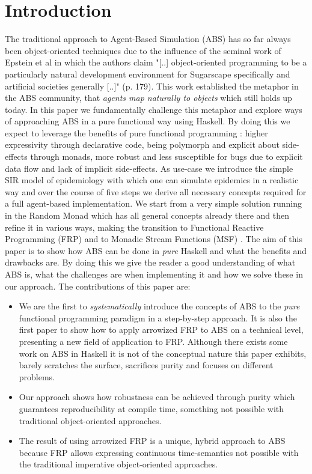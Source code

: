 \section{Introduction}
The traditional approach to Agent-Based Simulation (ABS) has so far always been object-oriented techniques due to the influence of the seminal work of Epstein et al \cite{epstein_growing_1996} in which the authors claim "[..] object-oriented programming to be a particularly natural development environment for Sugarscape specifically and artificial societies generally [..]" (p. 179). This work established the metaphor in the ABS community, that \textit{agents map naturally to objects} \cite{north_managing_2007} which still holds up today.
In this paper we fundamentally challenge this metaphor and explore ways of approaching ABS in a pure functional way using Haskell. By doing this we expect to leverage the benefits of pure functional programming \cite{hudak_history_2007}: higher expressivity through declarative code, being polymorph and explicit about side-effects through monads, more robust and less susceptible for bugs due to explicit data flow and lack of implicit side-effects.
As use-case we introduce the simple SIR model of epidemiology with which one can simulate epidemics in a realistic way and over the course of five steps we derive all necessary concepts required for a full agent-based implementation. We start from a very simple solution running in the Random Monad which has all general concepts already there and then refine it in various ways, making the transition to Functional Reactive Programming (FRP) \cite{wan_functional_2000} and to Monadic Stream Functions (MSF) \cite{perez_functional_2016}.
The aim of this paper is to show how ABS can be done in \textit{pure} Haskell and what the benefits and drawbacks are. By doing this we give the reader a good understanding of what ABS is, what the challenges are when implementing it and how we solve these in our approach.
The contributions of this paper are:

\begin{itemize}
	\item We are the first to \textit{systematically} introduce the concepts of ABS to the \textit{pure} functional programming paradigm in a step-by-step approach. It is also the first paper to show how to apply arrowized FRP to ABS on a technical level, presenting a new field of application to FRP. Although there exists some work on ABS in Haskell it is not of the conceptual nature this paper exhibits, barely scratches the surface, sacrifices purity and focuses on different problems.
	\item Our approach shows how robustness can be achieved through purity which guarantees reproducibility at compile time, something not possible with traditional object-oriented approaches.
	\item The result of using arrowized FRP is a unique, hybrid approach to ABS because FRP allows expressing continuous time-semantics not possible with the traditional imperative object-oriented approaches.
\end{itemize}

